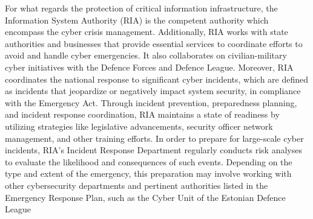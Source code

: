 For what regards the protection of critical information infrastructure, the Information System Authority (RIA) is the competent authority which encompass the cyber crisis management. Additionally, RIA works with state authorities and businesses that provide essential services to coordinate efforts to avoid and handle cyber emergencies. It also collaborates on civilian-military cyber initiatives with the Defence Forces and Defence League. Moreover, RIA coordinates the national response to significant cyber incidents, which are defined as incidents that jeopardize or negatively impact system security, in compliance with the Emergency Act. Through incident prevention, preparedness planning, and incident response coordination, RIA maintains a state of readiness by utilizing strategies like legislative advancements, security officer network management, and other training efforts. In order to prepare for large-scale cyber incidents, RIA's Incident Response Department regularly conducts risk analyses to evaluate the likelihood and consequences of such events. Depending on the type and extent of the emergency, this preparation may involve working with other cybersecurity departments and pertinent authorities listed in the Emergency Response Plan, such as the Cyber Unit of the Estonian Defence League \autocite{informationsystemauthority_2022_cyber}


